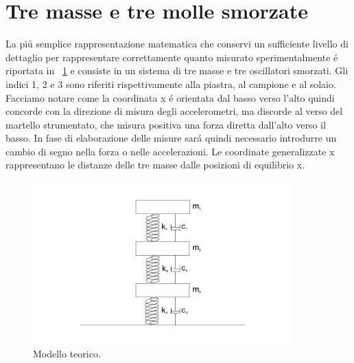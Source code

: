 \documentclass[12pt,a4paper]{article}
\begin{document}
 \section{Tre masse e tre molle smorzate}
 	La pi\'u semplice rappresentazione matematica che conservi un sufficiente livello di dettaglio per rappresentare correttamente quanto misurato sperimentalmente \'e riportata in \figurename~\ref{fig:model} e consiste in un sistema di tre masse e tre oscillatori smorzati. Gli indici 1, 2 e 3 sono riferiti rispettivamente alla piastra, al campione e al solaio. Facciamo notare come la coordinata x \'e orientata dal basso verso l'alto quindi concorde con la direzione di misura degli accelerometri, ma discorde al verso del martello strumentato, che misura positiva una forza diretta dall'alto verso il basso. In fase di elaborazione delle misure sar\'a quindi necessario introdurre un cambio di segno nella forza o nelle accelerazioni.
 	Le coordinate generalizzate x rappresentano le distanze delle tre masse dalle posizioni di equilibrio x.
 	\begin{figure}
 		\centering
 		\includegraphics[width=10cm]{model}
 		\caption{Modello teorico.}
 		\label{fig:model}
 	\end{figure}
 	
 	
\end{document}
